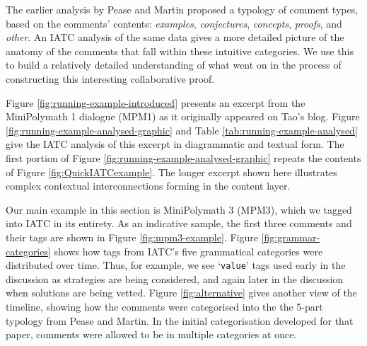 \documentclass[smallextended,oneside]{svjour3}       %
\newcommand\nothing[1]{#1}
\let\paragraph\nothing
\begin{document}
The earlier analysis by Pease and Martin proposed a typology of comment types, based on the comments' contents:
\emph{examples},
\emph{conjectures},
\emph{concepts},
\emph{proofs},
and \emph{other}.  
An IATC analysis of the same data gives a more detailed picture of the anatomy of the comments that fall within these intuitive categories.  We use this to build a relatively detailed understanding of what went on in the process of constructing this interesting collaborative proof.




\paragraph{Figure \ref{fig:running-example-introduced} presents an excerpt from the MiniPolymath 1 dialogue (MPM1) as it originally appeared on Tao's blog.}
Figure \ref{fig:running-example-analysed-graphic} and Table
\ref{tab:running-example-analysed} give the IATC analysis of this
excerpt in diagrammatic and textual form.  The first portion of Figure
\ref{fig:running-example-analysed-graphic} repeats the contents of Figure
\ref{fig:QuickIATCexample}.  The longer excerpt shown here illustrates
complex contextual interconnections forming in the content
layer.

\paragraph{Our main example in this section is MiniPolymath 3 (MPM3),
which we tagged into IATC in its entirety.}
As an indicative sample, the first three comments and their tags are shown in Figure
\ref{fig:mpm3-example}.
Figure \ref{fig:grammar-categories} shows how tags from IATC's five grammatical
categories were distributed over time.  Thus, for example, we see
`\texttt{value}' tags used early in the discussion as strategies are
being considered, and again later in the discussion when solutions are
being vetted.
Figure \ref{fig:alternative} gives another view of the timeline,
showing how the comments were categorised into the the 5-part typology
from Pease and Martin.  In the initial
categorisation developed for that paper, comments were allowed to be
in multiple categories at once.
\end{document}
